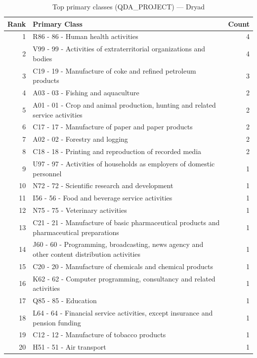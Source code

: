 \begin{table}[H]
    \centering
    \begin{tabular}{r p{10cm} r}
    \hline
    \textbf{Rank} & \textbf{Primary Class} & \textbf{Count} \\
    \hline
    1 & R86 - 86 - Human health activities & 4 \\
    2 & V99 - 99 - Activities of extraterritorial organizations and bodies & 4 \\
    3 & C19 - 19 - Manufacture of coke and refined petroleum products & 3 \\
    4 & A03 - 03 - Fishing and aquaculture & 2 \\
    5 & A01 - 01 - Crop and animal production, hunting and related service activities & 2 \\
    6 & C17 - 17 - Manufacture of paper and paper products & 2 \\
    7 & A02 - 02 - Forestry and logging & 2 \\
    8 & C18 - 18 - Printing and reproduction of recorded media & 2 \\
    9 & U97 - 97 - Activities of households as employers of domestic personnel & 1 \\
    10 & N72 - 72 - Scientific research and development & 1 \\
    11 & I56 - 56 - Food and beverage service activities & 1 \\
    12 & N75 - 75 - Veterinary activities & 1 \\
    13 & C21 - 21 - Manufacture of basic pharmaceutical products and pharmaceutical preparations & 1 \\
    14 & J60 - 60 - Programming, broadcasting, news agency and other content distribution activities & 1 \\
    15 & C20 - 20 - Manufacture of chemicals and chemical products & 1 \\
    16 & K62 - 62 - Computer programming, consultancy and related activities & 1 \\
    17 & Q85 - 85 - Education & 1 \\
    18 & L64 - 64 - Financial service activities, except insurance and pension funding & 1 \\
    19 & C12 - 12 - Manufacture of tobacco products & 1 \\
    20 & H51 - 51 - Air transport & 1 \\
    \hline
    \end{tabular}
    \caption{Top primary classes (QDA\_PROJECT) --- Dryad}
\end{table}

